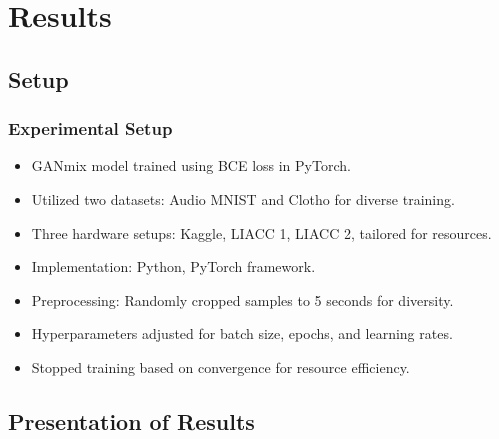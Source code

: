 \section{Results}

\subsection{Setup}

\begin{frame}
    \frametitle{Experimental Setup}

    \begin{itemize}
        \item GANmix model trained using BCE loss in PyTorch.
        \item Utilized two datasets: Audio MNIST and Clotho for diverse training.
        \item Three hardware setups: Kaggle, LIACC 1, LIACC 2, tailored for resources.
        \item Implementation: Python, PyTorch framework.
        \item Preprocessing: Randomly cropped samples to 5 seconds for diversity.
        \item Hyperparameters adjusted for batch size, epochs, and learning rates.
        \item Stopped training based on convergence for resource efficiency.
    \end{itemize}
\end{frame}

\subsection{Presentation of Results}

